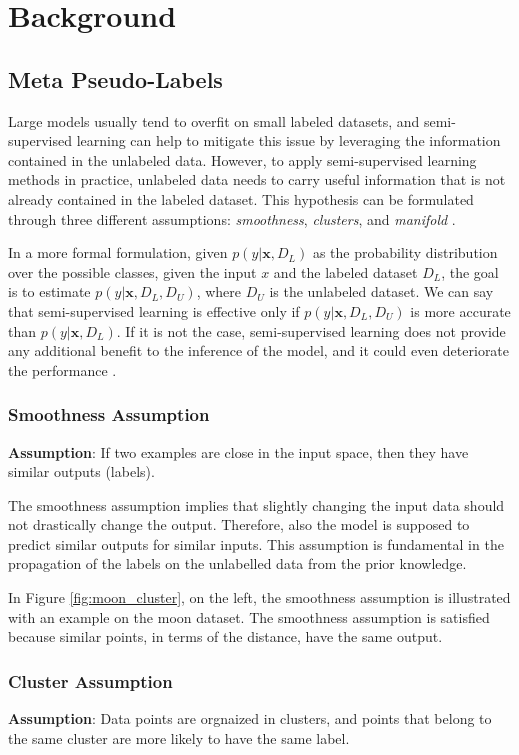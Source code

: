 \chapter{Background}
\label{chpt:background}

\section{Meta Pseudo-Labels}
Large models usually tend to overfit on 
small labeled datasets, and semi-supervised learning can help to mitigate this 
issue by leveraging the information contained in the unlabeled data.
However, to apply semi-supervised learning methods in practice, unlabeled data 
needs to carry useful information that is not already contained in the labeled 
dataset. This hypothesis can be formulated through three different assumptions: 
\emph{smoothness}, \emph{clusters}, and \emph{manifold} 
\cite{chapelle2010semi}.

In a more formal formulation, given $p(y|\bm{x}, D_L)$ as the probability 
distribution over the possible classes, given the input $x$ and the labeled 
dataset $D_L$, the goal is to estimate $p(y|\bm{x}, D_L, D_U)$, where $D_U$ is the 
unlabeled dataset. We can say that semi-supervised learning is effective only if 
$p(y|\bm{x}, D_L, D_U)$ is more accurate than $p(y|\bm{x}, D_L)$. If it is not 
the case, semi-supervised learning does not provide any additional benefit to 
the inference of the model, and it could even deteriorate the performance 
\cite{chapelle2010semi}.

\subsection{Smoothness Assumption}
\textbf{Assumption}: If two examples are close in the input space, then they 
have similar outputs (labels).

The smoothness assumption implies that slightly changing the input data should 
not drastically change the output. Therefore, also the model is supposed to 
predict similar outputs for similar inputs. This assumption is fundamental in 
the propagation of the labels on the unlabelled data from the prior knowledge.

In Figure \ref{fig:moon_cluster}, on the left, the smoothness assumption is 
illustrated with an example on the moon dataset. The smoothness assumption 
is satisfied because similar points, in terms of the distance, have the same 
output.

\subsection{Cluster Assumption}
\textbf{Assumption}: Data points are orgnaized in clusters, and points that 
belong to the same cluster are more likely to have the same label.


